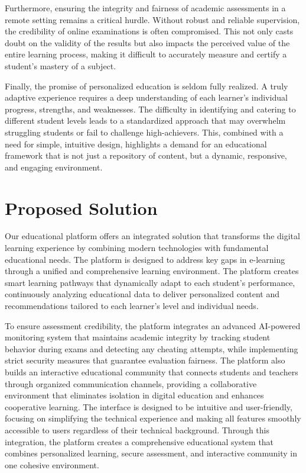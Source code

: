 Furthermore, ensuring the integrity and fairness of academic assessments in a remote setting remains a critical hurdle. Without robust and reliable supervision, the credibility of online examinations is often compromised. This not only casts doubt on the validity of the results but also impacts the perceived value of the entire learning process, making it difficult to accurately measure and certify a student's mastery of a subject.

Finally, the promise of personalized education is seldom fully realized. A truly adaptive experience requires a deep understanding of each learner's individual progress, strengths, and weaknesses. The difficulty in identifying and catering to different student levels leads to a standardized approach that may overwhelm struggling students or fail to challenge high-achievers. This, combined with a need for simple, intuitive design, highlights a demand for an educational framework that is not just a repository of content, but a dynamic, responsive, and engaging environment.

\section{Proposed Solution}
\label{sec:proposed_solution}
Our educational platform offers an integrated solution that transforms the digital learning experience by combining modern technologies with fundamental educational needs. The platform is designed to address key gaps in e-learning through a unified and comprehensive learning environment. The platform creates smart learning pathways that dynamically adapt to each student's performance, continuously analyzing educational data to deliver personalized content and recommendations tailored to each learner's level and individual needs.

To ensure assessment credibility, the platform integrates an advanced AI-powered monitoring system that maintains academic integrity by tracking student behavior during exams and detecting any cheating attempts, while implementing strict security measures that guarantee evaluation fairness. The platform also builds an interactive educational community that connects students and teachers through organized communication channels, providing a collaborative environment that eliminates isolation in digital education and enhances cooperative learning. The interface is designed to be intuitive and user-friendly, focusing on simplifying the technical experience and making all features smoothly accessible to users regardless of their technical background. Through this integration, the platform creates a comprehensive educational system that combines personalized learning, secure assessment, and interactive community in one cohesive environment.

